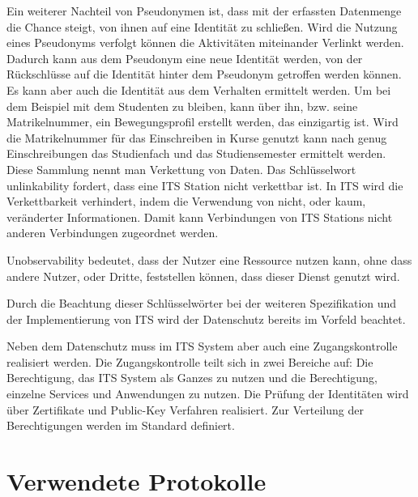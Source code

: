 Ein weiterer Nachteil von Pseudonymen ist, dass mit der erfassten Datenmenge die Chance steigt, von ihnen auf eine Identität zu schließen. Wird die Nutzung eines Pseudonyms verfolgt können die Aktivitäten miteinander Verlinkt werden. Dadurch kann aus dem Pseudonym eine neue Identität werden, von der Rückschlüsse auf die Identität hinter dem Pseudonym getroffen werden können. Es kann aber auch die Identität aus dem Verhalten ermittelt werden. Um bei dem Beispiel mit dem Studenten zu bleiben, kann über ihn, bzw. seine Matrikelnummer, ein Bewegungsprofil erstellt werden, das  einzigartig ist. Wird die Matrikelnummer für das Einschreiben in Kurse genutzt kann nach genug Einschreibungen das Studienfach und das Studiensemester ermittelt werden. Diese Sammlung nennt man Verkettung von Daten. Das Schlüsselwort unlinkability fordert, dass eine \ac{ITS} Station nicht verkettbar ist. In \ac{ITS} wird die Verkettbarkeit verhindert, indem die Verwendung von nicht, oder kaum, veränderter Informationen. Damit kann Verbindungen von \ac{ITS} Stations nicht anderen Verbindungen zugeordnet werden.

Unobservability bedeutet, dass der Nutzer eine Ressource nutzen kann, ohne dass andere Nutzer, oder Dritte, feststellen können, dass dieser Dienst genutzt wird.

Durch die Beachtung dieser Schlüsselwörter bei der weiteren Spezifikation und der Implementierung von \ac{ITS} wird der Datenschutz bereits im Vorfeld beachtet. 

Neben dem Datenschutz muss im \ac{ITS} System aber auch eine Zugangskontrolle realisiert werden. Die Zugangskontrolle teilt sich in zwei Bereiche auf: Die Berechtigung, das \ac{ITS} System als Ganzes zu nutzen und die Berechtigung, einzelne Services und Anwendungen zu nutzen. Die Prüfung der Identitäten wird über Zertifikate und Public-Key Verfahren realisiert. Zur Verteilung der Berechtigungen werden im Standard \cite{ts102731} definiert.


\section{Verwendete Protokolle}




